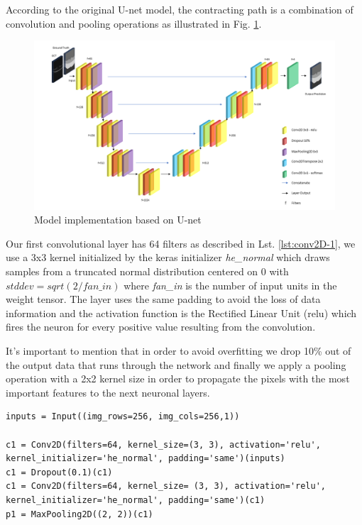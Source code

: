 \documentclass[12pt,a4paper]{scrartcl}
\begin{document}
According to the original U-net model, the contracting path is a combination of convolution and pooling operations as illustrated in Fig. \ref{fig:model}.

\begin{figure}[H]
    \centering
    \includegraphics[width=\textwidth]{./images/U-net_ThesisVersion.png}
    \caption{Model implementation based on U-net}
    \label{fig:model}
\end{figure}

Our first convolutional layer has 64 filters as described in Lst. \ref{lst:conv2D-1}, we use a 3x3 kernel initialized by the keras initializer \emph{he\_normal} which draws samples from a truncated normal distribution centered on 0 with $stddev = sqrt(2 / fan\_in)$ where \emph{fan\_in} is the number of input units in the weight tensor. The layer uses the same padding to avoid the loss of data information and the activation function is the Rectified Linear Unit (relu) which fires the neuron for every positive value resulting from the convolution. 

It's important to mention that in order to avoid overfitting we drop 10\% out of the output data that runs through the network and finally we apply a pooling operation with a 2x2 kernel size in order to propagate the pixels with the most important features to the next neuronal layers.

\begin{lstlisting}[caption={Implementation of the first level of the contracting path, the rest of the layer can be found in the \emph{get\_unet()} method from \emph{model.py}}, label={lst:conv2D-1}]
inputs = Input((img_rows=256, img_cols=256,1))

c1 = Conv2D(filters=64, kernel_size=(3, 3), activation='relu', kernel_initializer='he_normal', padding='same')(inputs)
c1 = Dropout(0.1)(c1)
c1 = Conv2D(filters=64, kernel_size= (3, 3), activation='relu', kernel_initializer='he_normal', padding='same')(c1)
p1 = MaxPooling2D((2, 2))(c1)
\end{lstlisting}
\end{document}
